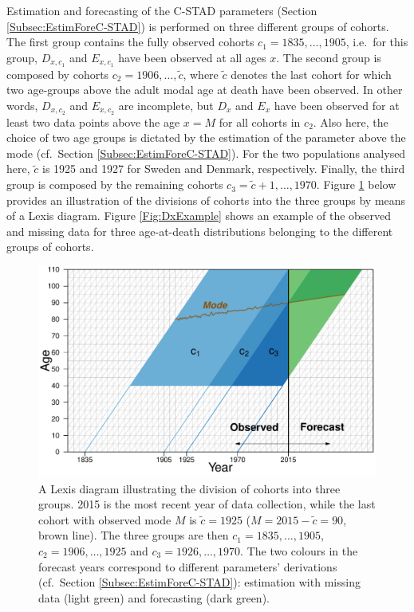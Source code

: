 \documentclass[11pt, a4paper]{article}
\begin{document}
Estimation and forecasting of the C-STAD parameters (Section \ref{Subsec:EstimForeC-STAD}) is performed on three different groups of cohorts. The first group contains the fully observed cohorts $c_1 =1835,\ldots,1905$, i.e.~for this group, $D_{x,c_1}$ and $E_{x,c_1}$ have been observed at all ages $x$. The second group is composed by cohorts $c_2 =1906, \ldots, \tilde{c}$, where $\tilde{c}$ denotes the last cohort for which two age-groups above the adult modal age at death have been observed. In other words, $D_{x,c_2}$ and $E_{x,c_2}$ are incomplete, but $D_x$ and $E_x$ have been observed for at least two data points above the age $x=M$ for all cohorts in $c_2$. Also here, the choice of two age groups is dictated by the estimation of the parameter above the mode (cf.~Section \ref{Subsec:EstimForeC-STAD}). For the two populations analysed here, $\tilde{c}$ is 1925 and 1927 for Sweden and Denmark, respectively. Finally, the third group is composed by the remaining cohorts $c_3 =\tilde{c}+1, \ldots, 1970$. Figure \ref{Fig:Lexis} below provides an illustration of the divisions of cohorts into the three groups by means of a Lexis diagram. Figure \ref{Fig:DxExample} shows an example of the observed and missing data for three age-at-death distributions belonging to the different groups of cohorts. \par

\begin{figure}[h!]
	\begin{center}
		\includegraphics[scale=0.7]{./Figures/F2.pdf} 
		\caption{A Lexis diagram illustrating the division of cohorts into three groups. 2015 is the most recent year of data collection, while the last cohort with observed mode $M$ is $\tilde{c}=1925$ ($M=2015-\tilde{c}=90$, brown line). The three groups are then $c_1=1835, \ldots, 1905$, $c_2=1906, \ldots, 1925$ and $c_3=1926, \ldots, 1970$. The two colours in the forecast years correspond to different parameters' derivations (cf.~Section \ref{Subsec:EstimForeC-STAD}): estimation with missing data (light green) and forecasting (dark green). \label{Fig:Lexis}}    
	\end{center}
\end{figure}
\end{document}
